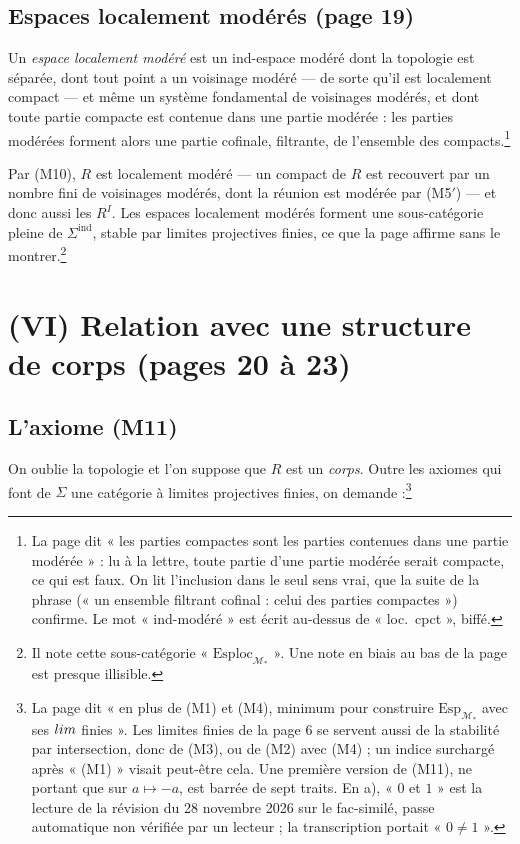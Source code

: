 \documentclass[11pt,a4paper]{article}
\begin{document}
\subsection*{Espaces localement modérés (page 19)}

Un \emph{espace localement modéré} est un ind-espace modéré dont la topologie
est séparée, dont tout point a un voisinage modéré — de sorte qu'il est
localement compact — et même un système fondamental de voisinages modérés, et
dont toute partie compacte est contenue dans une partie modérée : les parties
modérées forment alors une partie cofinale, filtrante, de l'ensemble des
compacts.\footnote{La page dit « les parties compactes sont les parties
contenues dans une partie modérée » : lu à la lettre, toute partie d'une
partie modérée serait compacte, ce qui est faux. On lit l'inclusion dans le
seul sens vrai, que la suite de la phrase (« un ensemble filtrant cofinal :
celui des parties compactes ») confirme. Le mot « ind-modéré » est écrit
au-dessus de « loc.\ cpct », biffé.}

Par (M10), $R$ est localement modéré — un compact de $R$ est recouvert par un
nombre fini de voisinages modérés, dont la réunion est modérée par (M5$'$) — et
donc aussi les $R^I$. Les espaces localement modérés forment une
sous-catégorie pleine de $\Sigma^{\mathrm{ind}}$, stable par limites
projectives finies, ce que la page affirme sans le montrer.\footnote{Il note
cette sous-catégorie « $\mathrm{Esploc}_{\mathcal{M}_*}$ ». Une note en biais
au bas de la page est presque illisible.}

\section*{(VI) Relation avec une structure de corps (pages 20 à 23)}

\subsection*{L'axiome (M11)}

On oublie la topologie et l'on suppose que $R$ est un \emph{corps}. Outre les
axiomes qui font de $\Sigma$ une catégorie à limites projectives finies, on
demande :\footnote{La page dit « en plus de (M1) et (M4), minimum pour
construire $\mathrm{Esp}_{\mathcal{M}_*}$ avec ses $\varprojlim$ finies ».
Les limites finies de la page 6 se servent aussi de la stabilité par
intersection, donc de (M3), ou de (M2) avec (M4) ; un indice surchargé après
« (M1) » visait peut-être cela. Une première version de (M11), ne portant que
sur $a \mapsto -a$, est barrée de sept traits. En a), « $0$ et $1$ » est la
lecture de la révision du 28 novembre 2026 sur le fac-similé, passe
automatique non vérifiée par un lecteur ; la transcription portait
« $0 \neq 1$ ».}
\end{document}
